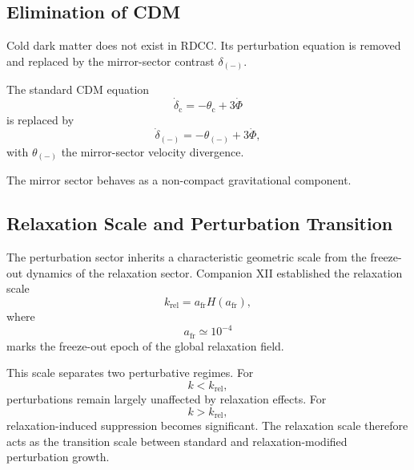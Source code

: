 \documentclass[11pt,a4paper]{article}
\begin{document}

\subsection[Elimination of CDM]{Elimination of CDM}

Cold dark matter does not exist in RDCC. Its perturbation equation is removed
and replaced by the mirror-sector contrast \(\delta_{(-)}\).

The standard CDM equation
\begin{equation}
\dot{\delta}_{\mathrm{c}} = -\theta_{\mathrm{c}} + 3\dot{\Phi}
\end{equation}
is replaced by
\begin{equation}
\dot{\delta}_{(-)} = -\theta_{(-)} + 3\dot{\Phi},
\end{equation}
with \(\theta_{(-)}\) the mirror-sector velocity divergence.

The mirror sector behaves as a non-compact gravitational component.


\subsection{Relaxation Scale and Perturbation Transition}

The perturbation sector inherits a characteristic geometric scale from the
freeze-out dynamics of the relaxation sector. Companion XII established the
relaxation scale
\begin{equation}
  k_{\mathrm{rel}}
  =
  a_{\mathrm{fr}} H(a_{\mathrm{fr}}),
\end{equation}
where
\begin{equation}
  a_{\mathrm{fr}} \simeq 10^{-4}
\end{equation}
marks the freeze-out epoch of the global relaxation field.

This scale separates two perturbative regimes. For
\begin{equation}
  k < k_{\mathrm{rel}},
\end{equation}
perturbations remain largely unaffected by relaxation effects. For
\begin{equation}
  k > k_{\mathrm{rel}},
\end{equation}
relaxation-induced suppression becomes significant. The relaxation scale
therefore acts as the transition scale between standard and
relaxation-modified perturbation growth.
\end{document}
